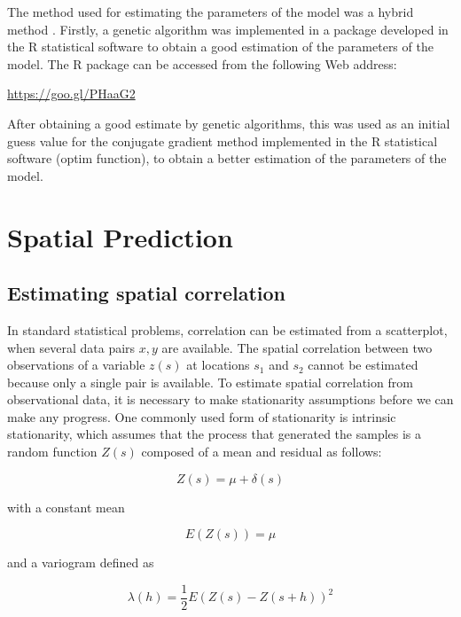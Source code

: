 \documentclass[11pt,twoside]{rmta2010eng}%
\begin{document}
The method used for estimating the parameters of the model was a hybrid method \cite{McNelis2005}. Firstly, a genetic algorithm was implemented in a package developed in the R statistical software \cite{rproject} to obtain a good estimation of the parameters of the model. The R package can be accessed from the following Web address:
 
\url{https://goo.gl/PHaaG2}

After obtaining a good estimate by genetic algorithms, this was used as an initial guess value for the conjugate gradient method implemented in the R statistical software (optim function), to obtain a better estimation of the parameters of the model.


\section{Spatial Prediction}

\subsection*{Estimating spatial correlation}

In standard statistical problems, correlation can be estimated from a scatterplot, when several data pairs ${x, y}$ are available. The spatial correlation between two observations of a variable $z(s)$ at locations $s_{1}$ and $s_{2}$ cannot be estimated because only a single pair is available. To estimate spatial correlation
from observational data, it is necessary to make stationarity assumptions
before we can make any progress. One commonly used form of stationarity
is intrinsic stationarity, which assumes that the process that generated the
samples is a random function $Z(s)$ composed of a mean and residual \cite{bivand2008applied} as follows:

\begin{equation}
Z(s) = \mu + \delta(s)
\end{equation}

with a constant mean 

\begin{equation}
E\left(Z(s)\right) = \mu
\end{equation}

and a variogram defined as 

\begin{equation}
\lambda(h) = \frac{1}{2}E\left(Z(s) - Z(s+h)\right)^{2}
\end{equation}
\end{document}
